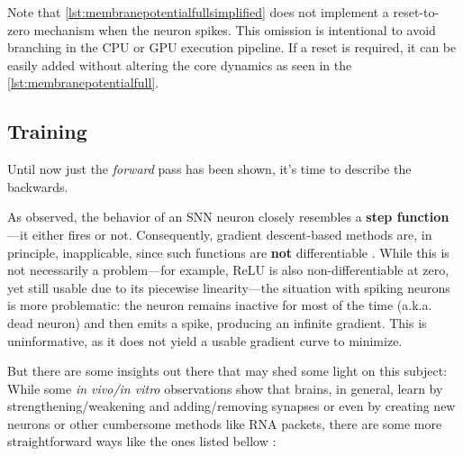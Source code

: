 			
			
			
			\par Note that \autoref{lst:membranepotentialfullsimplified} does not implement a reset-to-zero mechanism when the neuron spikes. This omission is intentional to avoid branching in the CPU or GPU execution pipeline. If a reset is required, it can be easily added without altering the core dynamics as seen in the \autoref{lst:membranepotentialfull}.
 			
 	\subsection*{\textbf{Training}}
 	
 		\par Until now just the \textit{forward} pass has been shown, it's time to describe the backwards.
 	
		\par As observed, the behavior of an SNN neuron closely resembles a \textbf{step function}—it either fires or not. Consequently, gradient descent-based methods are, in principle, inapplicable, since such functions are \textbf{not} differentiable \cite{kasabov2019time}. While this is not necessarily a problem—for example, ReLU is also non-differentiable at zero, yet still usable due to its piecewise linearity—the situation with spiking neurons is more problematic: the neuron remains inactive for most of the time (a.k.a. dead neuron) and then emits a spike, producing an infinite gradient. This is uninformative, as it does not yield a usable gradient curve to minimize. \newline
		
		\par But there are some insights out there that may shed some light on this subject: While some \textit{in vivo/in vitro} observations show that brains, in general, learn by strengthening/weakening and adding/removing synapses or even by creating new neurons or other cumbersome methods like RNA packets, there are some more straightforward ways like the ones listed bellow \cite{kasabov2019time}:
 	
